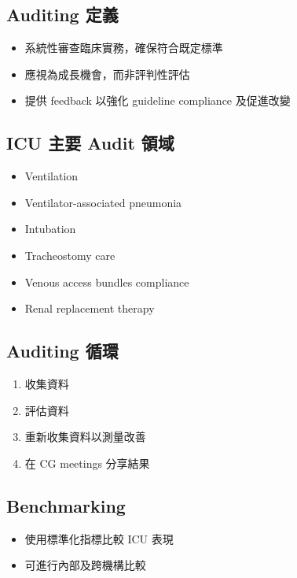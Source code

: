 \documentclass[12pt,a4paper]{article}
\begin{document}
\subsection{Auditing 定義}

\begin{itemize}
    \item 系統性審查臨床實務，確保符合既定標準
    \item 應視為成長機會，而非評判性評估
    \item 提供 feedback 以強化 guideline compliance 及促進改變
\end{itemize}

\subsection{ICU 主要 Audit 領域}

\begin{itemize}
    \item Ventilation
    \item Ventilator-associated pneumonia
    \item Intubation
    \item Tracheostomy care
    \item Venous access bundles compliance
    \item Renal replacement therapy
\end{itemize}

\subsection{Auditing 循環}

\begin{enumerate}
    \item 收集資料
    \item 評估資料
    \item 重新收集資料以測量改善
    \item 在 CG meetings 分享結果
\end{enumerate}


\subsection{Benchmarking}

\begin{itemize}
    \item 使用標準化指標比較 ICU 表現
    \item 可進行內部及跨機構比較
\end{itemize}
\end{document}
